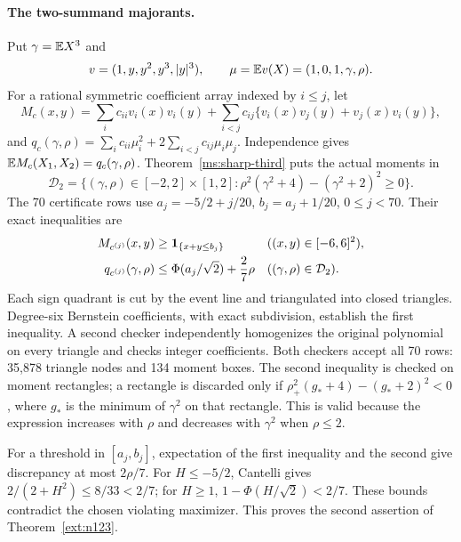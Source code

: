 \paragraph{The two-summand majorants.}
Put $\gamma=\mathbb E X^3$ and
\[
 v=(1,y,y^2,y^3,|y|^3),\qquad \mu=\mathbb E v(X)=(1,0,1,\gamma,\rho).
\]
For a rational symmetric coefficient array indexed by $i\le j$, let
\[
 M_c(x,y)=\sum_i c_{ii}v_i(x)v_i(y)+
 \sum_{i<j}c_{ij}\{v_i(x)v_j(y)+v_j(x)v_i(y)\},
\]
and $q_c(\gamma,\rho)=\sum_i c_{ii}\mu_i^2+
2\sum_{i<j}c_{ij}\mu_i\mu_j$.
Independence gives $\mathbb E M_c(X_1,X_2)=q_c(\gamma,\rho)$.
Theorem~\ref{ms:sharp-third} puts the actual moments in
\[
 \mathcal D_2=\{(\gamma,\rho)\in[-2,2]\times[1,2]:
 \rho^2(\gamma^2+4)-(\gamma^2+2)^2\ge0\}.
\]
The 70 certificate rows use
$a_j=-5/2+j/20$, $b_j=a_j+1/20$, $0\le j<70$.
Their exact inequalities are
\begin{align*}
 M_{c^{(j)}}(x,y)&\ge\mathbf 1_{\{x+y\le b_j\}}
                    &&((x,y)\in[-6,6]^2),\\
 q_{c^{(j)}}(\gamma,\rho)&\le\Phi(a_j/\sqrt2)+\frac27\rho
                    &&((\gamma,\rho)\in\mathcal D_2).
\end{align*}
Each sign quadrant is cut by the event line and triangulated into
closed triangles.  Degree-six Bernstein coefficients, with exact
subdivision, establish the first inequality.  A second checker
independently homogenizes the original polynomial on every triangle
and checks integer coefficients.  Both checkers accept all 70 rows:
35,878 triangle nodes and 134 moment boxes.  The second inequality is
checked on moment rectangles; a rectangle is discarded only if
$\rho_+^2(g_*+4)-(g_*+2)^2<0$, where $g_*$ is the minimum of
$\gamma^2$ on that rectangle.  This is valid because the expression
increases with $\rho$ and decreases with $\gamma^2$ when $\rho\le2$.

For a threshold in $[a_j,b_j]$, expectation of the first inequality and
the second give discrepancy at most $2\rho/7$.
For $H\le-5/2$, Cantelli gives $2/(2+H^2)\le8/33<2/7$;
for $H\ge1$, $1-\Phi(H/\sqrt2)<2/7$.
These bounds contradict the chosen violating maximizer.  This proves
the second assertion of Theorem~\ref{ext:n123}.

